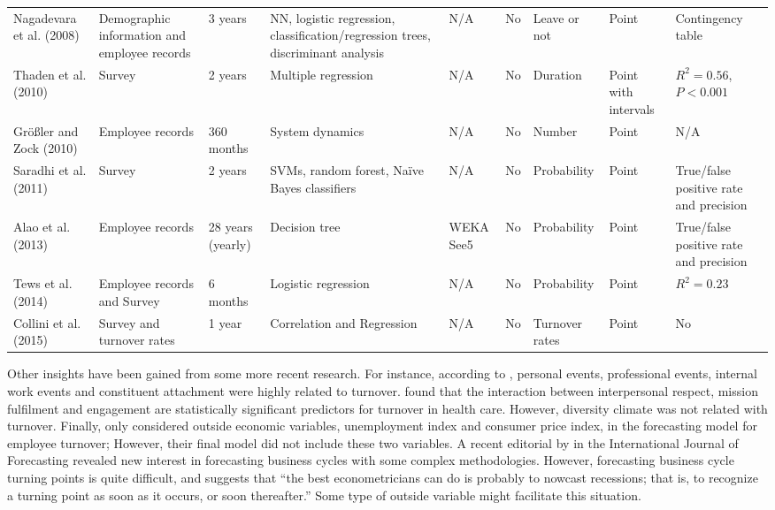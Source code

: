 \begin{landscape}
\begin{table}[htbp]
\begin{tabular}{L{2.8cm}  L{2.8cm}  C{1.2cm}  L{3cm} C{1.2cm}  C{1.5cm} C{1.5cm} C{1.5cm}  L{2.8cm}}
			Nagadevara et al. (2008) & Demographic information and employee records & 3 years & NN, logistic regression, classification/regression trees, discriminant analysis & N/A   & No    & Leave or not & Point & Contingency table \\
			
			Thaden et al. (2010) & Survey & 2 years & Multiple regression & N/A   & No    & Duration & Point with intervals &  $R^2=0.56$, $P< 0.001$ \\
			
			Größler and Zock (2010) & Employee records & 360 months & System dynamics  & N/A   & No    & Number & Point & N/A \\
			
			Saradhi et al. (2011) & Survey & 2 years & SVMs, random forest,  Naïve Bayes classifiers & N/A   & No    & Probability  & Point & True/false positive rate and precision \\
			
			Alao et al. (2013) &  Employee records   & 28 years (yearly) & Decision tree & WEKA See5 & No    & Probability  & Point & True/false positive rate and precision \\
			Tews et al. (2014) & Employee records and Survey & 6 months & Logistic regression & N/A   & No    & Probability & Point & $R^2=0.23$ \\
			Collini et al. (2015) & Survey and turnover rates   & 1 year & Correlation and Regression & N/A   & No    & Turnover rates & Point & No \\
			
			\bottomrule
		\end{tabular}%
		\label{tab:1}%
	\end{table}%
\end{landscape}
Other insights have been gained from some more recent research. For instance, according to \citet{tews2014}, personal events, professional events, internal work events and constituent attachment were highly related to turnover. \citet{collini2015} found that the interaction between interpersonal respect, mission fulfilment and engagement are statistically significant predictors for turnover in health care. However, diversity climate was not related with turnover. Finally, only \citet{sexton2005} considered outside economic variables, unemployment index and consumer price index, in the forecasting model for employee turnover; However, their final model did not include these two variables.
A recent editorial by \citep{ferrara2014} in the International Journal of Forecasting revealed new interest in forecasting business cycles with some complex methodologies. However, forecasting business cycle turning points is quite difficult, and \citet{hamilton2011} suggests that “the best econometricians can do is probably to nowcast recessions; that is, to recognize a turning point as soon as it occurs, or soon thereafter.”  Some type of outside variable might facilitate this situation.


